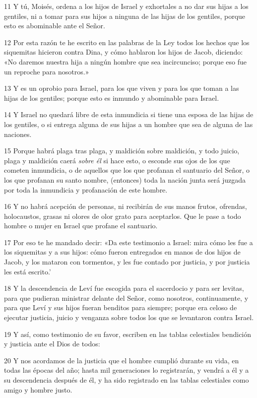 \par 11 Y tú, Moisés, ordena a los hijos de Israel y exhortales a no dar sus hijas a los gentiles, ni a tomar para sus hijos a ninguna de las hijas de los gentiles, porque esto es abominable ante el Señor.
\par 12 Por esta razón te he escrito en las palabras de la Ley todos los hechos que los siquemitas hicieron contra Dina, y cómo hablaron los hijos de Jacob, diciendo: «No daremos nuestra hija a ningún hombre que sea incircunciso; porque eso fue un reproche para nosotros.»
\par 13 Y es un oprobio para Israel, para los que viven y para los que toman a las hijas de los gentiles; porque esto es inmundo y abominable para Israel.
\par 14 Y Israel no quedará libre de esta inmundicia si tiene una esposa de las hijas de los gentiles, o si entrega alguna de sus hijas a un hombre que sea de alguna de las naciones.
\par 15 Porque habrá plaga tras plaga, y maldición sobre maldición, y todo juicio, plaga y maldición caerá \textit{sobre él} si hace esto, o esconde sus ojos de los que cometen inmundicia, o de aquellos que los que profanan el santuario del Señor, o los que profanan su santo nombre, (entonces) toda la nación junta será juzgada por toda la inmundicia y profanación de este hombre.
\par 16 Y no habrá acepción de personas, ni recibirán de sus manos frutos, ofrendas, holocaustos, grasas ni olores de olor grato para aceptarlos. Que le pase a todo hombre o mujer en Israel que profane el santuario.
\par 17 Por eso te he mandado decir: «Da este testimonio a Israel: mira cómo les fue a los siquemitas y a sus hijos: cómo fueron entregados en manos de dos hijos de Jacob, y los mataron con tormentos, y les fue contado por justicia, y por justicia les está escrito.'
\par 18 Y la descendencia de Leví fue escogida para el sacerdocio y para ser levitas, para que pudieran ministrar delante del Señor, como nosotros, continuamente, y para que Leví y sus hijos fueran benditos para siempre; porque era celoso de ejecutar justicia, juicio y venganza sobre todos los que se levantaron contra Israel.
\par 19 Y así, como testimonio de su favor, escriben en las tablas celestiales bendición y justicia ante el Dios de todos:
\par 20 Y nos acordamos de la justicia que el hombre cumplió durante su vida, en todas las épocas del año; hasta mil generaciones lo registrarán, y vendrá a él y a su descendencia después de él, y ha sido registrado en las tablas celestiales como amigo y hombre justo.
